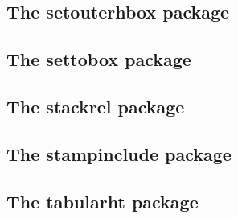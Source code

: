 \documentclass[a4paper,12pt]{article}
\makeatletter
\newcommand*{\xpackage}[1]{\textsf{#1}}
\newcommand*{\xext}[1]{\texttt{.#1}}
\newcommand*{\cs}[1]{\texttt{\textbackslash#1}}
\newcommand*{\tocinclude}[1]{%
  \setcounter{tocdepth}{3}%
  \begingroup
    \makeatletter
    \def\@prj{#1}%
    \let\contentsline\foreign@contentsline
  \endgroup
}
\def\foreign@contentsline#1#2#3#4{%
  \ifx\\#4\\%
    \csname l@#1\endcsname{#2}{#3}%
  \else
    \ifHy@linktocpage
      \csname l@#1\endcsname{{#2}}{%
        \hyper@linkfile{#3}{\@prj.pdf}{#4}%
      }%
    \else
      \csname l@#1\endcsname{%
        \hyper@linkfile{#2}{\@prj.pdf}{#4}%
      }{#3}%
    \fi
  \fi
}%
\newcommand*{\pkgsectformat}[1]{%
  \texorpdfstring{%
    \textcolor{link}{The} %
    \xpackage{#1} %
    \textcolor{link}{package}%
  }{#1}%
}
\makeatother
\begin{document}
\newpage
\subsection{\pkgsectformat{setouterhbox}}
\label{setouterhbox}
\begin{abstract}
If math stuff is set in an \cs{hbox}, then TeX
performs some optimization and omits the implicite
penalties \cs{binoppenalty} and \cs{relpenalty}.
This packages tries to put stuff into an \cs{hbox}
without getting lost of those penalties.
\end{abstract}
\tocinclude{setouterhbox}

\newpage
\subsection{\pkgsectformat{settobox}}
\label{settobox}
\begin{abstract}
Commands are defined for getting box sizes similar
to \LaTeX's \cs{settowidth} commands.
\end{abstract}
\tocinclude{settobox}

\newpage
\subsection{\pkgsectformat{stackrel}}
\label{stackrel}
\begin{abstract}
This package adds an optional argument to \cs{stackrel} for
putting something below the relational symbol and defines
\cs{stackbin} for binary symbols.
\end{abstract}
\tocinclude{stackrel}

\newpage
\subsection{\pkgsectformat{stampinclude}}
\label{stampinclude}
\begin{abstract}
The package replaces \cs{includeonly} and selects the files for
\cs{include} by inspecting the time stamp of the \xext{aux} file.
The file is selected for inclusion if the \xext{aux} file does
not yet exist or is older than the corresponding \xext{tex} file.
\end{abstract}
\tocinclude{stampinclude}

\newpage
\subsection{\pkgsectformat{tabularht}}
\label{tabularht}
\begin{abstract}
This package defines some environments that adds
a height specification to tabular and array.
\end{abstract}
\tocinclude{tabularht}
\end{document}
